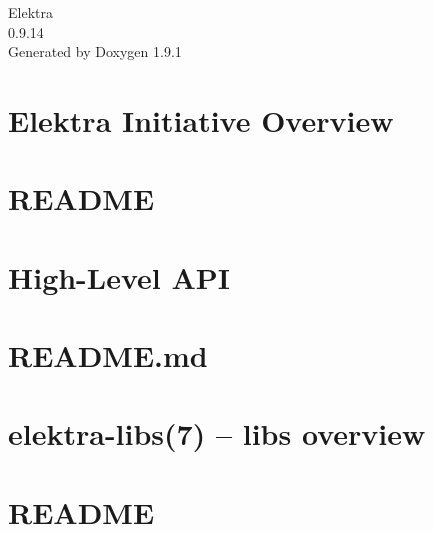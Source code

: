 \let\mypdfximage\pdfximage\def\pdfximage{\immediate\mypdfximage}\documentclass[twoside]{book}
\newcommand{\+}{\discretionary{\mbox{\scriptsize$\hookleftarrow$}}{}{}}
\newcommand{\clearemptydoublepage}{%
  \newpage{\pagestyle{empty}\cleardoublepage}%
}
\begin{document}
\raggedbottom

\hypersetup{pageanchor=false,
             bookmarksnumbered=true,
             pdfencoding=unicode
            }
\begin{titlepage}
\vspace*{7cm}
\begin{center}%
{\Large Elektra \\[1ex]\large 0.\+9.\+14 }\\
\vspace*{1cm}
{\large Generated by Doxygen 1.9.1}\\
\end{center}
\end{titlepage}
\clearemptydoublepage
{}
\tableofcontents
\clearemptydoublepage
{}
\hypersetup{pageanchor=true}

\chapter{Elektra Initiative Overview}
\label{index}\hypertarget{index}{}
\chapter{README}
\label{md_src_libs_elektra_README}

\chapter{High-\/\+Level API}
\label{src_libs_highlevel_README_md}

\chapter{README.\+md}
\label{src_libs_merge_README_md}

\chapter{elektra-\/libs(7) -- libs overview}
\label{src_libs_README_md}

\chapter{README}
\label{md_src_libs_template_README}

\end{document}
